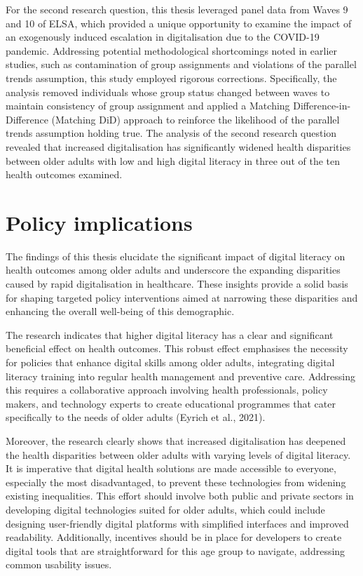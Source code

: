 For the second research question, this thesis leveraged panel data from Waves 9 and 10 of ELSA, which provided a unique opportunity to examine the impact of an exogenously induced escalation in digitalisation due to the COVID-19 pandemic. Addressing potential methodological shortcomings noted in earlier studies, such as contamination of group assignments and violations of the parallel trends assumption, this study employed rigorous corrections. Specifically, the analysis removed individuals whose group status changed between waves to maintain consistency of group assignment and applied a Matching Difference-in-Difference (Matching DiD) approach to reinforce the likelihood of the parallel trends assumption holding true. The analysis of the second research question revealed that increased digitalisation has significantly widened health disparities between older adults with low and high digital literacy in three out of the ten health outcomes examined. 

\section{Policy implications}
The findings of this thesis elucidate the significant impact of digital literacy on health outcomes among older adults and underscore the expanding disparities caused by rapid digitalisation in healthcare. These insights provide a solid basis for shaping targeted policy interventions aimed at narrowing these disparities and enhancing the overall well-being of this demographic.

The research indicates that higher digital literacy has a clear and significant beneficial effect on health outcomes. This robust effect emphasises the necessity for policies that enhance digital skills among older adults, integrating digital literacy training into regular health management and preventive care. Addressing this requires a collaborative approach involving health professionals, policy makers, and technology experts to create educational programmes that cater specifically to the needs of older adults (Eyrich et al., 2021).

Moreover, the research clearly shows that increased digitalisation has deepened the health disparities between older adults with varying levels of digital literacy. It is imperative that digital health solutions are made accessible to everyone, especially the most disadvantaged, to prevent these technologies from widening existing inequalities. This effort should involve both public and private sectors in developing digital technologies suited for older adults, which could include designing user-friendly digital platforms with simplified interfaces and improved readability. Additionally, incentives should be in place for developers to create digital tools that are straightforward for this age group to navigate, addressing common usability issues.

